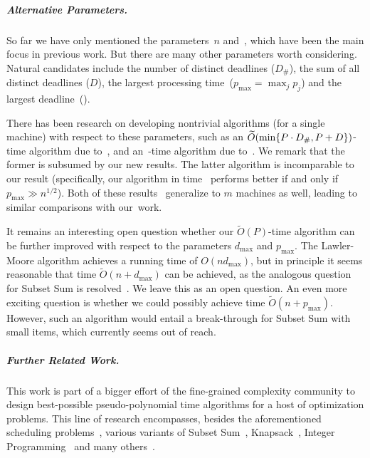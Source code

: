 \documentclass[10pt,a4paper]{article}
\DeclarePairedDelimiter\set{\lbrace}{\rbrace}
\newcommand\Order{O}
\newcommand\MTPT{\smash{$1||\sum p_j U_j$}}
\begin{document}
\subparagraph{Alternative Parameters.}
So far we have only mentioned the parameters~$n$ and~, which have been the main focus in previous work. But there are many other parameters worth considering. Natural candidates include the number of distinct deadlines ($D_\#$), the sum of all distinct deadlines ($D$), the largest processing time~($p_{\max} = \max_j p_j$) and the largest deadline~().

There has been research on developing nontrivial \MTPT{} algorithms (for a single machine) with respect to these parameters, such as an $\widetilde\Order(\min\set{P \cdot D_\#, P + D})$-time algorithm due to~\cite{BringmannFHSW22}, and an~\smash{$\widetilde\Order(n + p_{\max}^3)$}-time algorithm due to~\cite{KleinPR23}. We remark that the former is subsumed by our new results. The latter algorithm is incomparable to our result (specifically, our algorithm in time~\smash{$\widetilde\Order(P) = \widetilde\Order(n p_{\max})$} performs better if and only if $p_{\max} \gg n^{1/2}$). Both of these results~\cite{BringmannFHSW22,KleinPR23} generalize to $m$ machines as well, leading to similar comparisons with our~work.

It remains an interesting open question whether our $\widetilde\Order(P)$-time algorithm can be further improved with respect to the parameters $d_{\max}$ and $p_{\max}$. The Lawler-Moore algorithm achieves a running time of $O(n d_{\max})$, but in principle it seems reasonable that time $\widetilde\Order(n + d_{\max})$ can be achieved, as the analogous question for Subset Sum is resolved~\cite{Bringmann17,JinW19}. We leave this as an open question. An even more exciting question is whether we could possibly achieve time $\widetilde\Order(n + p_{\max})$. However, such an algorithm would entail a break-through for Subset Sum with small items, which currently seems out of reach.

\subparagraph{Further Related Work.}
This work is part of a bigger effort of the fine-grained complexity community to design best-possible pseudo-polynomial time algorithms for a host of optimization problems. This line of research encompasses, besides the aforementioned scheduling problems~\cite{BringmannFHSW22,HermelinMS22,KleinPR23,SchieberS23}, various variants of Subset Sum~\cite{KoiliarisX19,Bringmann17,AbboudBHS19,AxiotisBJTW19,AxiotisT19,BringmannW21,PolakRW21,AxiotisBBJNTW21,CardinalI21,Potepa21,DengMZ23}, Knapsack~\cite{Tamir09,CyganMWW19,KunnemannPS17,BateniHSS18,EisenbrandW20,PolakRW21,BringmannC23,ChenLMZ24,BringmannC22,Bringmann23,Jin23}, Integer Programming~\cite{EisenbrandW20,JansenR23} and many others~\cite{ChanH22,DengMZ23}.
\end{document}

